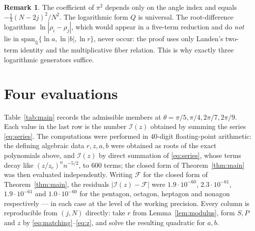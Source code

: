 \documentclass[11pt]{article}
\theoremstyle{definition}
\newtheorem{remark}[theorem]{Remark}
\newcommand{\Q}{\mathbb{Q}}
\begin{document}
\begin{remark}
The coefficient of $\pi^2$ depends only on the angle index and equals
$-\tfrac13(N-2j)^2/N^2$. The logarithmic form $Q$ is universal. The root-difference logarithms
$\ln|\rho_i-\rho_j|$, which would appear in a five-term reduction and do \emph{not} lie in
$\mathrm{span}_\Q\{\ln a,\ln|b|,\ln r\}$, never occur: the proof uses only Landen's two-term
identity and the multiplicative fiber relation. This is why exactly three logarithmic generators
suffice.
\end{remark}

\section{Four evaluations}\label{sec:examples}

Table~\ref{tab:main} records the admissible members at $\theta=\pi/5,\pi/4,2\pi/7,2\pi/9$. Each
value in the last row is the number $\mathcal{I}(z)$ obtained by summing the series
\eqref{eq:series}. The computations were performed in $40$-digit floating-point arithmetic: the
defining algebraic data $r,z,a,b$ were obtained as roots of the exact polynomials above, and
$\mathcal{I}(z)$ by direct summation of \eqref{eq:series}, whose terms decay like
$(z/z_c)^n n^{-5/2}$, to $600$ terms; the closed form of Theorem~\ref{thm:main} was then evaluated
independently. Writing $\mathcal{F}$ for the closed form of Theorem~\ref{thm:main}, the residuals
$|\mathcal{I}(z)-\mathcal{F}|$ were $1.9\cdot10^{-60}$, $2.3\cdot10^{-61}$, $1.9\cdot10^{-61}$ and
$1.0\cdot10^{-60}$ for the pentagon, octagon, heptagon and nonagon respectively --- in each case at
the level of the working precision. Every column is reproducible from $(j,N)$ directly: take $r$ from
Lemma~\ref{lem:modulus}, form $S,P$ and $z$ by \eqref{eq:matching}--\eqref{eq:z}, and solve the
resulting quadratic for $a,b$.
\end{document}
